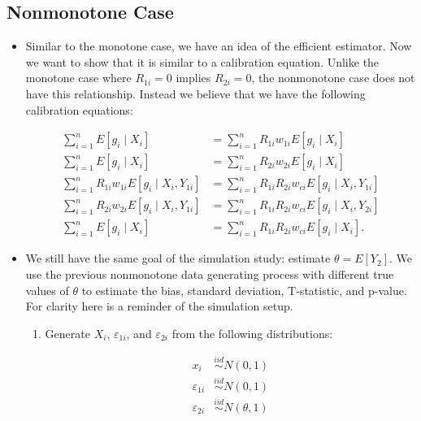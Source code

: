 \newpage

\subsection*{Nonmonotone Case}

\begin{itemize}
  \item Similar to the monotone case, we have an idea of the efficient
    estimator. Now we want to show that it is similar to a calibration equation.
    Unlike the monotone case where $R_{1i} = 0$ implies $R_{2i} = 0$, the
    nonmonotone case does not have this relationship. Instead we believe that we
    have the following calibration equations:

    \begin{align*}
      \sum_{i = 1}^n E[g_i \mid X_i] &= \sum_{i = 1}^n R_{1i} w_{1i} E[g_i \mid
      X_i]\\
      \sum_{i = 1}^n E[g_i \mid X_i] &= \sum_{i = 1}^n R_{2i} w_{2i} E[g_i \mid
      X_i]\\
      \sum_{i = 1}^n R_{1i} w_{1i} E[g_i \mid X_i, Y_{1i}] &= \sum_{i = 1}^n
      R_{1i} R_{2i} w_{ci} E[g_i \mid X_i, Y_{1i}]\\
      \sum_{i = 1}^n R_{2i} w_{2i} E[g_i \mid X_i, Y_{1i}] &= \sum_{i = 1}^n
      R_{1i} R_{2i} w_{ci} E[g_i \mid X_i, Y_{2i}]\\
      \sum_{i = 1}^n E[g_i \mid X_i] &= \sum_{i = 1}^n R_{1i} R_{2i} w_{ci}
      E[g_i \mid X_i].
    \end{align*}
  
  \item We still have the same goal of the simulation study: estimate $\theta =
    E[Y_2]$. We use the previous nonmonotone data generating process with
    different true values of $\theta$ to estimate the bias, standard deviation,
    T-statistic, and p-value. For clarity here is a reminder of the simulation
    setup.

    \begin{enumerate}
      \item Generate $X_i$, $\varepsilon_{1i}$, and $\varepsilon_{2i}$ from the
        following distributions:

        \begin{align*}
          x_i &\stackrel{iid}{\sim} N(0, 1)\\
          \varepsilon_{1i} &\stackrel{iid}{\sim} N(0, 1)\\
          \varepsilon_{2i} &\stackrel{iid}{\sim} N(\theta, 1)\\
        \end{align*}


\end{enumerate}
\end{itemize}

